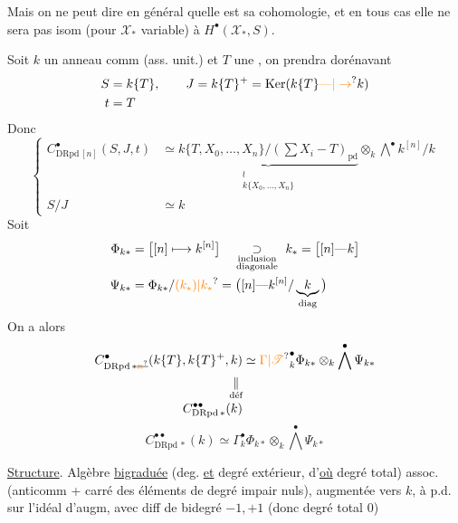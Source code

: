Mais on ne peut dire en général  quelle est sa cohomologie, et en tous cas elle ne sera pas isom (pour $\mathscr X_{\ast}$ variable) à $H^\bullet(\mathscr X_{\ast},S)$.

 Soit $k$ un anneau comm (ass. unit.) et $T$ une , on prendra dorénavant
\[
\begin{aligned}
S&=k\{T\},\qquad J=k\{T\}^{+}=\operatorname{Ker}(k\{T\}\unsure{\text{---}|\to} k)\\
t&=T
\end{aligned}
\]
Donc
\[
\left\{\begin{aligned}
C^\bullet_{\mathrm{DRpd}\,[n]}(S,J,t)&\simeq
\underbrace{k\{T,X_0,\ldots,X_n\}/(\textstyle\sum X_i-T)_{\mathrm{pd}}}_{\substack{\wr\\ k\{X_0,\ldots,X_n\}}}
\otimes_k\bigwedge^{\bullet}k^{[n]}/k\\
S/J&\simeq k
\end{aligned}\right.
\]
Soit
\[
\begin{aligned}
\Phi_{k\ast}&=\big[[n]\longmapsto k^{[n]}\big]\quad\underset{\substack{\text{inclusion}\\\text{diagonale}}}{\supset}\ k_\ast=\big[[n]\text{---}k\big]\\
\Psi_{k\ast}&=\Phi_{k\ast}/\unsure{(k_\ast)|k_\ast}=\big([n]\text{---}k^{[n]}/\underbrace{k}_{\mathrm{diag}}\big)
\end{aligned}
\]
On a alors
\[
\begin{aligned}
C^\bullet_{\mathrm{DRpd}\,\ast\deleted{\unsure{n}}}(k\{T\},k\{T\}^{+},k)&\simeq\unsure{\Gamma|\mathscr T}^{\bullet}_{k}\Phi_{k\ast}\otimes_k\bigwedge^\bullet\Psi_{k\ast}\\
\underset{\text{déf}}{\Vert}&\\[-2pt]
C^{\bullet\bullet}_{\mathrm{DRpd}\,\ast}(k)&
\end{aligned}
\]
\[
\boxed{C^{\bullet\bullet}_{\mathrm{DRpd}\,\ast}(k)\simeq\Gamma^\bullet_k\Phi_{k\ast}\otimes_k\bigwedge^\bullet\Psi_{k\ast}}
\]

\uline{Structure}. Algèbre  \uline{bigraduée} (deg.  \uline{et} degré extérieur, d'\uline{où} degré total)  assoc.  (anticomm + carré des éléments de degré impair nuls), augmentée vers $k$, à p.d. sur l'idéal d'augm, avec diff de bidegré $-1,+1$ (donc degré total 0) 

